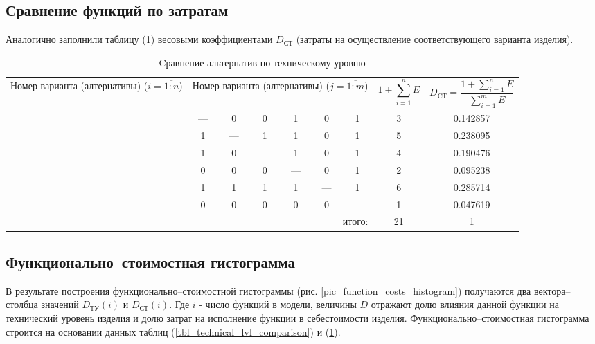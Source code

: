 \subsection{Сравнение функций по затратам}
Аналогично заполнили таблицу (\ref{tbl_costs_lvl_comparison}) весовыми
коэффициентами $D_\text{СТ}$ (затраты на осуществление соответствующего варианта
изделия).
\begin{table}[h!]
    \centering
    \begin{tabular}{|c|c|c|c|c|c|c|c|c|}
        \hline
        \multirow{2}{2.4cm}{
            \centering
            Номер варианта (алтернативы) ($i = \overline{1:n}$)
        } &
        \multicolumn{6}{c|}{
            \parbox[t]{2.4cm}{
                \centering
                Номер варианта (алтернативы) ($j = \overline{1:m}$)
            }
        } &
        \multirow{2}{1.7cm}[0pt]{
            \centering
            $$1 + \sum_{i=1}^n E$$
        } &
        \multirow{2}{3.2cm}{
            \centering
            $$ D_\text{CТ} = \frac{1 + \sum_{i=1}^n E}{\sum_{i=1}^m E}$$
        } \\
        &
        \centering{1} &
        \centering{2} &
        \centering{3} &
        \centering{4} &
        \centering{5} &
        \centering{6} & & \\
        \hline \hline
        \centering{1} &---& 0 & 0 & 1 & 0 & 1 & 3 & 0.142857 \\ \hline
        \centering{2} & 1 &---& 1 & 1 & 0 & 1 & 5 & 0.238095 \\ \hline
        \centering{3} & 1 & 0 &---& 1 & 0 & 1 & 4 & 0.190476 \\ \hline
        \centering{4} & 0 & 0 & 0 &---& 0 & 1 & 2 & 0.095238 \\ \hline
        \centering{5} & 1 & 1 & 1 & 1 &---& 1 & 6 & 0.285714 \\ \hline
        \centering{6} & 0 & 0 & 0 & 0 & 0 &---& 1 & 0.047619 \\ \hline
        \hline
        \multicolumn{7}{|r|}{итого:} & 21 & 1 \\
        \hline
    \end{tabular}
    \caption{Cравнение альтернатив по техническому уровню}
    \label{tbl_costs_lvl_comparison}
\end{table}

\subsection{Функционально--стоимостная гистограмма}
В результате построения функционально--стоимостной гистограммы
(рис. \ref{pic_function_costs_histogram}) получаются два вектора--столбца
значений $D_\text{ТУ}(i)$ и $D_\text{СТ}(i)$. Где $i$ - число функций в модели,
величины $D$ отражают долю влияния данной функции на технический уровень изделия
и долю затрат на исполнение функции в себестоимости изделия.
Функционально--стоимостная гистограмма строится на основании данных таблиц
(\ref{tbl_technical_lvl_comparison}) и (\ref{tbl_costs_lvl_comparison}).

